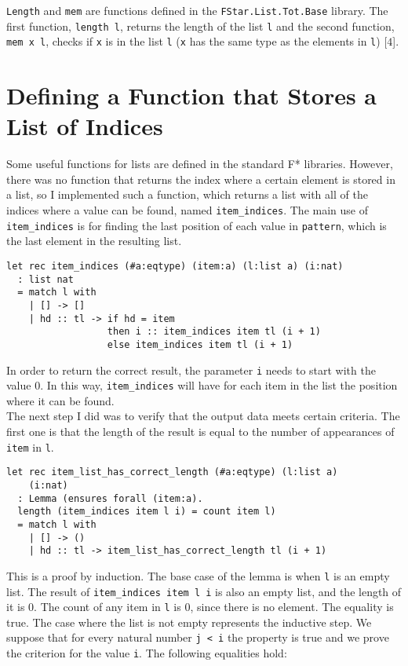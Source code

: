 \texttt{Length} and \texttt{mem} are functions defined in the \texttt{FStar.List.Tot.Base} library. The first function,  \texttt{length l}, returns the length of the list \texttt{l} and the second function, \texttt{mem x l}, checks if \texttt{x} is in the list \texttt{l} (\texttt{x} has the same type as the elements in \texttt{l}) [\(4\)].

\section{Defining a Function that Stores a List of Indices}

Some useful functions for lists are defined in the standard F* libraries. However, there was no function that returns the index where a certain element is stored in a list, so I implemented such a function, which returns a list with all of the indices where a value can be found, named \texttt{item\_indices}. The main use of \texttt{item\_indices} is for finding the last position of each value in \texttt{pattern}, which is the last element in the resulting list. 

\begin{verbatim}
let rec item_indices (#a:eqtype) (item:a) (l:list a) (i:nat) 
  : list nat 
  = match l with   
    | [] -> [] 
    | hd :: tl -> if hd = item 
                  then i :: item_indices item tl (i + 1) 
                  else item_indices item tl (i + 1)
\end{verbatim}

In order to return the correct result, the parameter \texttt{i} needs to start with the value \(0\). In this way, \texttt{item\_indices} will have for each item in the list the position where it can be found. \\
\indent The next step I did was to verify that the output data meets certain criteria. The first one is that the length of the result is equal to the number of appearances of \texttt{item} in \texttt{l}.

\begin{verbatim}
let rec item_list_has_correct_length (#a:eqtype) (l:list a) 
    (i:nat) 
  : Lemma (ensures forall (item:a). 
  length (item_indices item l i) = count item l) 
  = match l with 
    | [] -> () 
    | hd :: tl -> item_list_has_correct_length tl (i + 1)
\end{verbatim}

This is a proof by induction. The base case of the lemma is when \texttt{l} is an empty list. The result of \texttt{item\_indices item l i} is also an empty list, and the length of it is \(0\). The count of any item in \texttt{l} is \(0\), since there is no element. The equality is true. The case where the list is not empty represents the inductive step. We suppose that for every natural number \texttt{j < i} the property is true and we prove the criterion for the value \texttt{i}. The following equalities hold:

